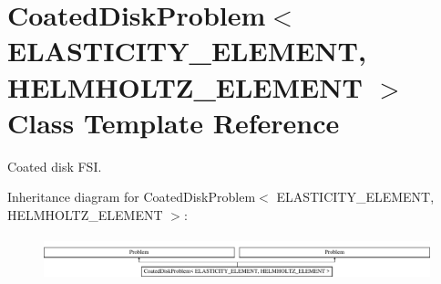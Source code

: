 \hypertarget{classCoatedDiskProblem}{}\section{Coated\+Disk\+Problem$<$ E\+L\+A\+S\+T\+I\+C\+I\+T\+Y\+\_\+\+E\+L\+E\+M\+E\+NT, H\+E\+L\+M\+H\+O\+L\+T\+Z\+\_\+\+E\+L\+E\+M\+E\+NT $>$ Class Template Reference}
\label{classCoatedDiskProblem}


Coated disk F\+SI.  


Inheritance diagram for Coated\+Disk\+Problem$<$ E\+L\+A\+S\+T\+I\+C\+I\+T\+Y\+\_\+\+E\+L\+E\+M\+E\+NT, H\+E\+L\+M\+H\+O\+L\+T\+Z\+\_\+\+E\+L\+E\+M\+E\+NT $>$\+:\begin{figure}[H]
\begin{center}
\leavevmode
\includegraphics[height=1.272727cm]{classCoatedDiskProblem}
\end{center}
\end{figure}
